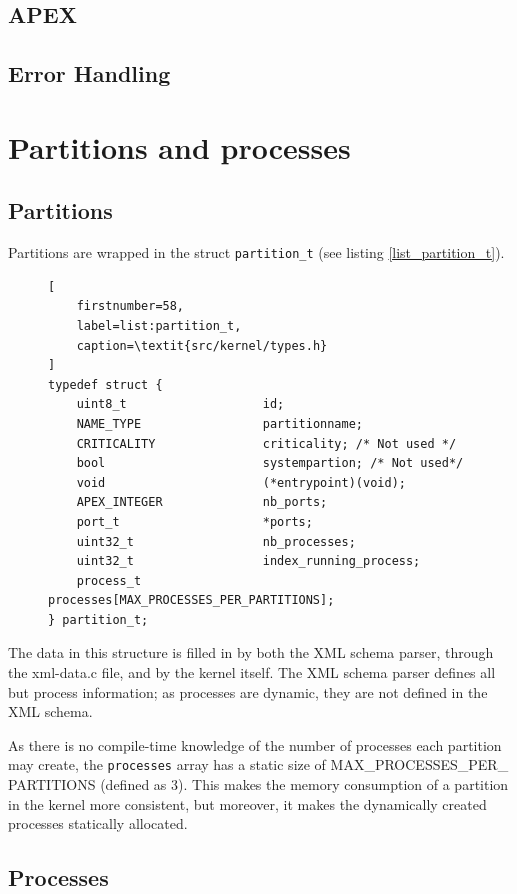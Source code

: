 \subsection{APEX}

\subsection{Error Handling}

\section{Partitions and processes}

\subsection{Partitions}
Partitions are wrapped in the struct \texttt{partition\_t} (see listing
\ref{list_partition_t}).
\begin{figure}
\begin{lstlisting}[
	firstnumber=58,
	label=list:partition_t,
	caption=\textit{src/kernel/types.h}
]
typedef struct {
    uint8_t                   id;
    NAME_TYPE                 partitionname;
    CRITICALITY	              criticality; /* Not used */
    bool                      systempartion; /* Not used*/
    void                      (*entrypoint)(void);
    APEX_INTEGER              nb_ports;
    port_t                    *ports;
    uint32_t                  nb_processes;
    uint32_t                  index_running_process;
    process_t                 processes[MAX_PROCESSES_PER_PARTITIONS];
} partition_t;
\end{lstlisting}
\end{figure} 
The data in this structure is filled in by both the
XML schema parser, through the xml-data.c file, and by the kernel itself.
The XML schema parser defines all but process information; as processes are
dynamic, they are not defined in the XML schema.

As there is no compile-time knowledge of the number of processes each partition
may create, the \texttt{processes} array has a static size of 
MAX\_PROCESSES\_PER\_ PARTITIONS (defined as 3). This makes the memory
consumption of a partition in the kernel more consistent, but moreover, it makes
the dynamically created processes statically allocated.\\

\subsection{Processes}

